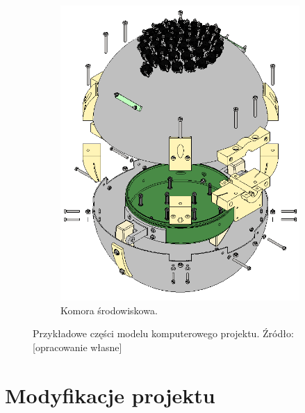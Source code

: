 \begin{figure}[]
\begin{subfigure}[b]{.49\textwidth}
		\label{fig:czwórnik}
	\end{subfigure}\vspace{15mm}%
	
	\begin{subfigure}{.8\textwidth}
		\centering
		\includegraphics[scale=0.3]{Komora_tweaked_colors_exploded}
		\caption{Komora środowiskowa.} 
		\label{fig:komora}
	\end{subfigure}
	
	\caption{Przykładowe części modelu komputerowego projektu. Źródło: [opracowanie własne]}
	
\end{figure}


\section{Modyfikacje projektu}

